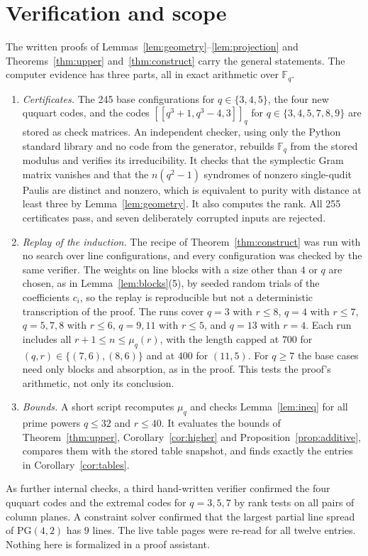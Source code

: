\documentclass[11pt]{amsart}
\theoremstyle{definition}
\theoremstyle{remark}
\newcommand{\F}{\mathbb F}
\newcommand{\qq}[1]{[\![#1]\!]}
\begin{document}
\section{Verification and scope}\label{sec:verification}

The written proofs of Lemmas~\ref{lem:geometry}--\ref{lem:projection} and Theorems~\ref{thm:upper} and~\ref{thm:construct} carry the general statements. The computer evidence has three parts, all in exact arithmetic over $\F_q$.
\begin{enumerate}
\item \emph{Certificates.} The 245 base configurations for $q\in\{3,4,5\}$, the four new ququart codes, and the codes $\qq{q^3+1,q^3-4,3}_q$ for $q\in\{3,4,5,7,8,9\}$ are stored as check matrices. An independent checker, using only the Python standard library and no code from the generator, rebuilds $\F_q$ from the stored modulus and verifies its irreducibility. It checks that the symplectic Gram matrix vanishes and that the $n(q^2-1)$ syndromes of nonzero single-qudit Paulis are distinct and nonzero, which is equivalent to purity with distance at least three by Lemma~\ref{lem:geometry}. It also computes the rank. All 255 certificates pass, and seven deliberately corrupted inputs are rejected.
\item \emph{Replay of the induction.} The recipe of Theorem~\ref{thm:construct} was run with no search over line configurations, and every configuration was checked by the same verifier. The weights on line blocks with a size other than $4$ or $q$ are chosen, as in Lemma~\ref{lem:blocks}(5), by seeded random trials of the coefficients $c_i$, so the replay is reproducible but not a deterministic transcription of the proof. The runs cover $q=3$ with $r\le8$, $q=4$ with $r\le7$, $q=5,7,8$ with $r\le6$, $q=9,11$ with $r\le5$, and $q=13$ with $r=4$. Each run includes all $r+1\le n\le\mu_q(r)$, with the length capped at $700$ for $(q,r)\in\{(7,6),(8,6)\}$ and at $400$ for $(11,5)$. For $q\ge7$ the base cases need only blocks and absorption, as in the proof. This tests the proof's arithmetic, not only its conclusion.
\item \emph{Bounds.} A short script recomputes $\mu_q$ and checks Lemma~\ref{lem:ineq} for all prime powers $q\le32$ and $r\le40$. It evaluates the bounds of Theorem~\ref{thm:upper}, Corollary~\ref{cor:higher} and Proposition~\ref{prop:additive}, compares them with the stored table snapshot, and finds exactly the entries in Corollary~\ref{cor:tables}.
\end{enumerate}
As further internal checks, a third hand-written verifier confirmed the four ququart codes and the extremal codes for $q=3,5,7$ by rank tests on all pairs of column planes. A constraint solver confirmed that the largest partial line spread of $\mathrm{PG}(4,2)$ has $9$ lines. The live table pages were re-read for all twelve entries.
Nothing here is formalized in a proof assistant.
\end{document}
